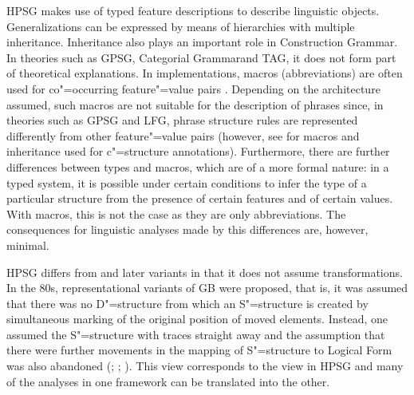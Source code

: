 HPSG makes use of typed feature descriptions to describe linguistic objects. Generalizations can be expressed by means of hierarchies with multiple inheritance.
Inheritance also plays an important role in Construction Grammar\indexcxg. In theories such as GPSG\indexgpsg, Categorial Grammar\indexcg and TAG\indextag, it
does not form part of theoretical explanations. In implementations, macros (abbreviations) are often used for co"=occurring feature"=value pairs
\citep*{DKK2004a}. Depending on the architecture assumed, such macros are not suitable for the description of phrases since, in theories such as GPSG\indexgpsg
and LFG\indexlfg, phrase structure rules are represented differently from other feature"=value pairs (however, see
 for macros and inheritance used for c"=structure annotations). Furthermore, there are further differences between types and macros, which are of a
more formal nature: in a typed system, it is possible under certain conditions to infer the type of a particular structure from the presence
of certain features and of certain values. With macros, this is not the case as they are only abbreviations. The consequences for linguistic analyses made by this differences are, however, minimal.

HPSG differs from \gbt and later variants in that it does not assume transformations. In the 80s, representational variants of GB were proposed, that is,
it was assumed that there was no D"=structure from which an S"=structure is created by simultaneous marking of the original position of moved elements.
Instead, one assumed the S"=structure with traces straight away and the assumption that there were further movements in the mapping of S"=structure to Logical
Form was also abandoned (\citealp{Koster78b-u}; \citealp[Section~1.4]{Haider93a};
\citealp[]{Frey93a}). This view corresponds to the view in HPSG and many of the analyses in one framework can be translated into the other.

